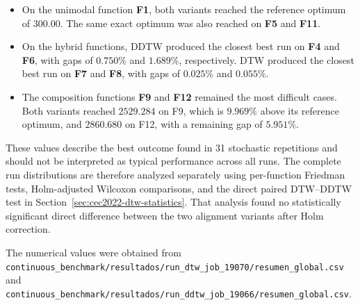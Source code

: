 \begin{itemize}
    \item On the unimodal function \textbf{F1}, both variants reached the
    reference optimum of $300.00$. The same exact optimum was also reached on
    \textbf{F5} and \textbf{F11}.
    \item On the hybrid functions, DDTW produced the closest best run on
    \textbf{F4} and \textbf{F6}, with gaps of $0.750\%$ and $1.689\%$,
    respectively. DTW produced the closest best run on \textbf{F7} and
    \textbf{F8}, with gaps of $0.025\%$ and $0.055\%$.
    \item The composition functions \textbf{F9} and \textbf{F12} remained the
    most difficult cases. Both variants reached $2529.284$ on F9, which is
    $9.969\%$ above its reference optimum, and $2860.680$ on F12, with a
    remaining gap of $5.951\%$.
\end{itemize}

These values describe the best outcome found in 31 stochastic repetitions and
should not be interpreted as typical performance across all runs. The complete
run distributions are therefore analyzed separately using per-function
Friedman tests, Holm-adjusted Wilcoxon comparisons, and the direct paired
DTW--DDTW test in Section~\ref{sec:cec2022-dtw-statistics}. That analysis
found no statistically significant direct difference between the two alignment
variants after Holm correction.

The numerical values were obtained from
\texttt{continuous\_benchmark/resultados/run\_dtw\_job\_19070/resumen\_global.csv}
and
\texttt{continuous\_benchmark/resultados/run\_ddtw\_job\_19066/resumen\_global.csv}.

